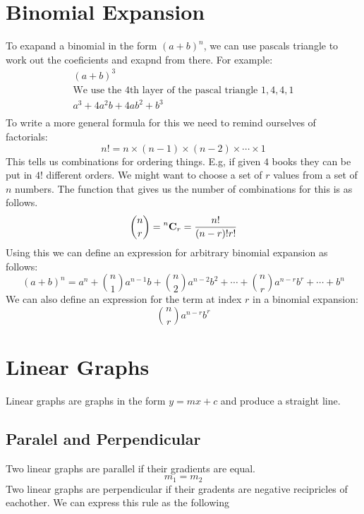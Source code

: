 \documentclass{article}
\begin{document}
\section{Binomial Expansion}

To exapand a binomial in the form $(a + b)^n$, we can use pascals triangle to work out the coeficients and exapnd from there.
For example:
\begin{gather*}
	(a + b)^3 \\
	\text{We use the 4th layer of the pascal triangle $1, 4, 4, 1$} \\
	a^3 + 4a^2b + 4ab^2 + b^3 \\
\end{gather*}
To write a more general formula for this we need to remind ourselves of factorials:
\begin{equation}
	n! = n \times (n - 1) \times (n - 2) \times \cdots \times 1
\end{equation}
This tells us combinations for ordering things. E.g, if given $4$ books they can be put in $4!$ different
orders. We might want to choose a set of $r$ values from a set of $n$ numbers. The function that gives us the number of
combinations for this is as follows.
\begin{equation}
	\binom{n}{r} = \prescript{n}{}{\mathbf{C}_r} = \frac{n!}{(n - r)!r!}
\end{equation}
Using this we can define an expression for arbitrary binomial expansion as follows:
\begin{equation}
	(a + b)^n = a^n + \binom{n}{1}a^{n - 1}b + \binom{n}{2}a^{n - 2}b^{2} + \cdots + \binom{n}{r}a^{n - r}b^{r} + \cdots + b^n
\end{equation}
We can also define an expression for the term at index $r$ in a binomial expansion:
\begin{equation}
	\binom{n}{r}a^{n - r}b^{r}
\end{equation}

\section{Linear Graphs}
Linear graphs are graphs in the form $y = mx + c$ and produce a straight line.

\subsection{Paralel and Perpendicular}
Two linear graphs are parallel if their gradients are equal.
\begin{equation}
	m_1 = m_2
\end{equation}
Two linear graphs are perpendicular if their gradents are negative recipricles of eachother. We can express this rule as the following
\end{document}
